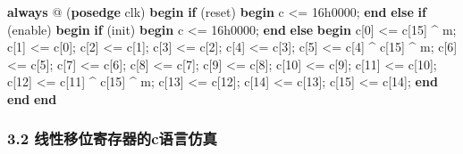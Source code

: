 \documentclass[
]{article}
\newenvironment{Shaded}{}{}
\newcommand{\BaseNTok}[1]{\textcolor[rgb]{0.25,0.63,0.44}{#1}}
\newcommand{\DecValTok}[1]{\textcolor[rgb]{0.25,0.63,0.44}{#1}}
\newcommand{\KeywordTok}[1]{\textcolor[rgb]{0.00,0.44,0.13}{\textbf{#1}}}
\newcommand{\NormalTok}[1]{#1}
\begin{document}
\begin{Shaded}
\begin{Highlighting}[]
\KeywordTok{always}\NormalTok{ @ (}\KeywordTok{posedge}\NormalTok{ clk) }\KeywordTok{begin}
	\KeywordTok{if}\NormalTok{ (reset) }\KeywordTok{begin}
\NormalTok{		c \textless{}= }\BaseNTok{16\textquotesingle{}h0000}\NormalTok{;}
	\KeywordTok{end} \KeywordTok{else} \KeywordTok{if}\NormalTok{ (enable) }\KeywordTok{begin}
		\KeywordTok{if}\NormalTok{ (init) }\KeywordTok{begin}
\NormalTok{			c \textless{}=  }\BaseNTok{16\textquotesingle{}h0000}\NormalTok{;}
		\KeywordTok{end} \KeywordTok{else} \KeywordTok{begin}
\NormalTok{			c[}\DecValTok{0}\NormalTok{]  \textless{}= c[}\DecValTok{15}\NormalTok{] \^{} m;}
\NormalTok{			c[}\DecValTok{1}\NormalTok{]  \textless{}= c[}\DecValTok{0}\NormalTok{];}
\NormalTok{			c[}\DecValTok{2}\NormalTok{]  \textless{}= c[}\DecValTok{1}\NormalTok{];}
\NormalTok{			c[}\DecValTok{3}\NormalTok{]  \textless{}= c[}\DecValTok{2}\NormalTok{];}
\NormalTok{			c[}\DecValTok{4}\NormalTok{]  \textless{}= c[}\DecValTok{3}\NormalTok{];}
\NormalTok{			c[}\DecValTok{5}\NormalTok{]  \textless{}= c[}\DecValTok{4}\NormalTok{] \^{} c[}\DecValTok{15}\NormalTok{] \^{} m;}
\NormalTok{			c[}\DecValTok{6}\NormalTok{]  \textless{}= c[}\DecValTok{5}\NormalTok{];}
\NormalTok{			c[}\DecValTok{7}\NormalTok{]  \textless{}= c[}\DecValTok{6}\NormalTok{];}
\NormalTok{			c[}\DecValTok{8}\NormalTok{]  \textless{}= c[}\DecValTok{7}\NormalTok{];}
\NormalTok{			c[}\DecValTok{9}\NormalTok{]  \textless{}= c[}\DecValTok{8}\NormalTok{];}
\NormalTok{			c[}\DecValTok{10}\NormalTok{] \textless{}= c[}\DecValTok{9}\NormalTok{];}
\NormalTok{			c[}\DecValTok{11}\NormalTok{] \textless{}= c[}\DecValTok{10}\NormalTok{];}
\NormalTok{			c[}\DecValTok{12}\NormalTok{] \textless{}= c[}\DecValTok{11}\NormalTok{] \^{} c[}\DecValTok{15}\NormalTok{] \^{} m;}
\NormalTok{			c[}\DecValTok{13}\NormalTok{] \textless{}= c[}\DecValTok{12}\NormalTok{];}
\NormalTok{			c[}\DecValTok{14}\NormalTok{] \textless{}= c[}\DecValTok{13}\NormalTok{];}
\NormalTok{			c[}\DecValTok{15}\NormalTok{] \textless{}= c[}\DecValTok{14}\NormalTok{];}
		\KeywordTok{end}
	\KeywordTok{end}
\KeywordTok{end}
\end{Highlighting}
\end{Shaded}

\hypertarget{header-n163}{%
\subsubsection{3.2 线性移位寄存器的c语言仿真}\label{header-n163}}
\end{document}
